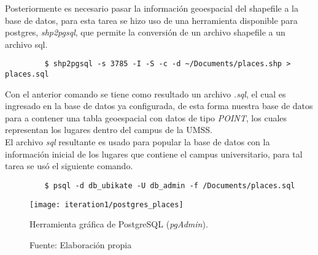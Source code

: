        Posteriormente es necesario pasar la información geoespacial del shapefile a la base de datos, para esta tarea se hizo uso de una herramienta disponible para postgres, \emph{shp2pgsql}, que permite la conversión de un archivo shapefile a un archivo sql.

       \begin{verbatim}
         $ shp2pgsql -s 3785 -I -S -c -d ~/Documents/places.shp > places.sql
       \end{verbatim}

       Con el anterior comando se tiene como resultado un archivo \emph{.sql}, el cual es ingresado en la base de datos ya configurada, de esta forma nuestra base de datos para a contener una tabla geoespacial con datos de tipo \emph{POINT}, los cuales representan los lugares dentro del campus de la UMSS.\\


       El archivo \emph{sql} resultante es usado para popular la base de datos con la información inicial de los lugares que contiene el campus universitario, para tal tarea se usó el siguiente comando.\\

       \begin{verbatim}
         $ psql -d db_ubikate -U db_admin -f /Documents/places.sql
       \end{verbatim}

       \begin{figure}[H]
         \begin{center}
           \texttt{[image: iteration1/postgres\_places]}
           \caption{Herramienta gráfica de PostgreSQL (\emph{pgAdmin}).}
           \label{fig:postgres_places}
           \caption*{Fuente: Elaboración propia}
         \end{center}
       \end{figure}


